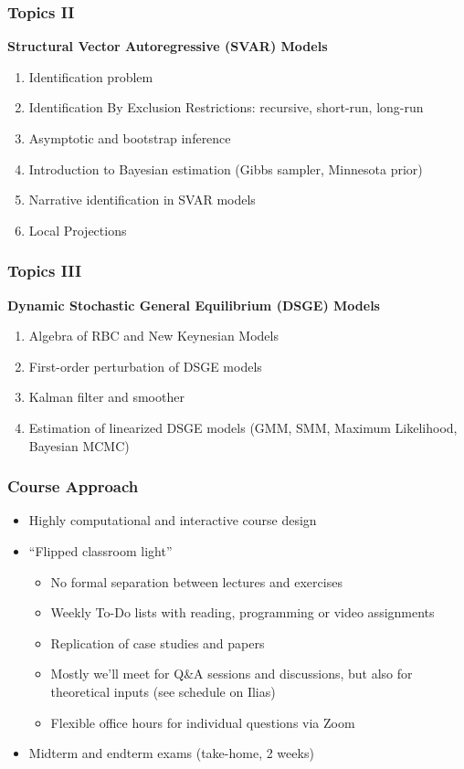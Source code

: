 \documentclass[10pt]{beamer}
\begin{document}
\begin{frame}
\frametitle{Topics II}
\textbf{Structural Vector Autoregressive (SVAR) Models}
\begin{enumerate}
    \item Identification problem
    \item Identification By Exclusion Restrictions: recursive, short-run, long-run
    \item Asymptotic and bootstrap inference
    \item Introduction to Bayesian estimation (Gibbs sampler, Minnesota prior)
    \item Narrative identification in SVAR models
    \item Local Projections
\end{enumerate}
\end{frame}

\begin{frame}
\frametitle{Topics III}
\textbf{Dynamic Stochastic General Equilibrium (DSGE) Models}
\begin{enumerate}
    \item Algebra of RBC and New Keynesian Models
    \item First-order perturbation of DSGE models
    \item Kalman filter and smoother
    \item Estimation of linearized DSGE models (GMM, SMM, Maximum Likelihood, Bayesian MCMC)
\end{enumerate}
\end{frame}

\begin{frame}
\frametitle{Course Approach}
\begin{itemize}
  \item Highly computational and interactive course design  
  \item ``Flipped classroom light''
  \begin{itemize}
    \item No formal separation between lectures and exercises
    \item Weekly To-Do lists with reading, programming or video assignments
    \item Replication of case studies and papers
    \item Mostly we'll meet for Q\&A sessions and discussions, but also for theoretical inputs (see schedule on Ilias)
    \item Flexible office hours for individual questions via Zoom
  \end{itemize}
  \item Midterm and endterm exams (take-home, 2 weeks)
\end{itemize}
\end{frame}
\end{document}
